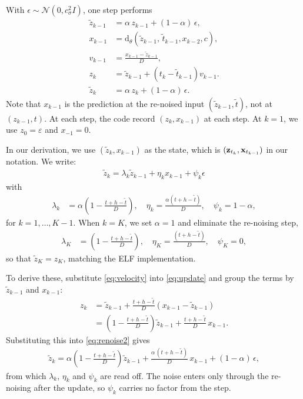 With $\epsilon \sim \mathcal{N}(0, c_\sigma^2I)$, one step performs
\begin{align}
  \tilde z_{k-1} &= \alpha\, z_{k-1} + (1 - \alpha)\, \epsilon,
    \label{eq:renoise} \\
  x_{k-1} &= \mathrm{d}_\theta\!\left(\tilde z_{k-1},\, \tilde t_{k-1}, x_{k-2}, c\right),
    \label{eq:predict} \\
  v_{k-1} &= \frac{x_{k-1} - \tilde z_{k-1}}{D},
    \label{eq:velocity} \\
  z_k &= \tilde z_{k-1} + \left(t_k - \tilde{t}_{k-1} \right) v_{k-1}.
    \label{eq:update} \\
  \tilde{z}_k &= \alpha\, z_{k} + (1 - \alpha)\, \epsilon.
    \label{eq:renoise2}
\end{align}
Note that $x_{k-1}$ is the prediction at the re-noised input
$(\tilde z_{k-1}, \tilde t)$, not at $(z_{k-1}, t)$. At each step,
the code record $(z_k, x_{k-1})$ at each step. At $k = 1$, we
use $z_{0} = \varepsilon$ and $x_{-1} = 0$.

In our derivation, we use $(\tilde{z}_{k}, x_{k-1})$ as the state, which is $({\mathbf{z}}_{t_k}, {\mathbf{x}}_{t_{k-1}})$ in our notation. We write:
\begin{align}
\tilde{z}_k = \lambda_k \tilde{z}_{k-1} + \eta_k x_{k-1} + \psi_k \epsilon
\end{align}
with
\begin{align}
\lambda_k &= \alpha \left(1 - \frac{t + h - \tilde t}{D}\right), \quad
\eta_k = \frac{\alpha (t + h - \tilde t)}{D}, \quad
\psi_k = 1 - \alpha,
\end{align}
for $k =1, \ldots, K - 1$. When $k = K$, we set $\alpha=1$ and eliminate the re-noising step,
\begin{align}
\lambda_K &= \left(1 - \frac{t + h - \tilde t}{D}\right), \quad
\eta_K = \frac{(t + h - \tilde t)}{D}, \quad
\psi_K = 0,
\end{align}
so that $\tilde{z}_K = z_K$, matching the ELF implementation.

To derive these, substitute \eqref{eq:velocity} into \eqref{eq:update} and group the terms by $\tilde z_{k-1}$ and $x_{k-1}$:
\begin{align*}
z_k &= \tilde z_{k-1} + \frac{t + h - \tilde t}{D}\left(x_{k-1} - \tilde z_{k-1}\right) \\
    &= \left(1 - \frac{t + h - \tilde t}{D}\right)\tilde z_{k-1} + \frac{t + h - \tilde t}{D}\, x_{k-1}.
\end{align*}
Substituting this into \eqref{eq:renoise2} gives
\begin{align*}
\tilde z_k = \alpha\left(1 - \frac{t + h - \tilde t}{D}\right)\tilde z_{k-1} + \frac{\alpha\,(t + h - \tilde t)}{D}\, x_{k-1} + (1 - \alpha)\,\epsilon,
\end{align*}
from which $\lambda_k$, $\eta_k$ and $\psi_k$ are read off. The noise enters only through the re-noising after the update, so $\psi_k$ carries no factor from the step.


